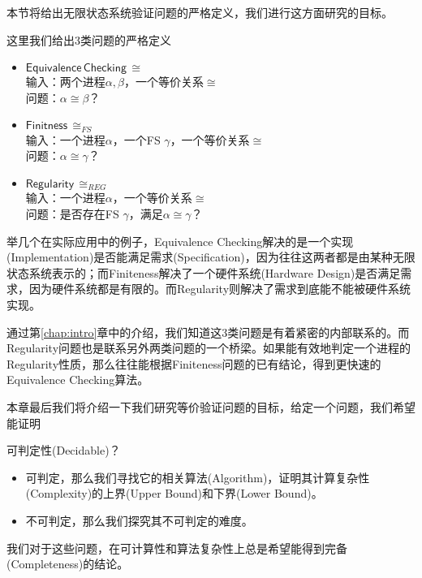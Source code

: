 本节将给出无限状态系统验证问题的严格定义，我们进行这方面研究的目标。
\begin{defn}[问题定义]\label{def:prob}
这里我们给出3类问题的严格定义
\begin{itemize}	
	\item $\mathsf{Equivalence\,Checking}\,\cong$\\
	输入：两个进程$\alpha,\beta$，一个等价关系$\cong$\\
	问题：$\alpha\cong\beta$？	
	\item $\mathsf{Finitness}\,\cong_{FS}$\\
	输入：一个进程$\alpha$，一个FS $\gamma$，一个等价关系$\cong$\\
	问题：$\alpha\cong\gamma$？
	\item $\mathsf{Regularity}\,\cong_{REG}$\\
	输入：一个进程$\alpha$，一个等价关系$\cong$\\
	问题：是否存在FS $\gamma$，满足$\alpha\cong\gamma$？
\end{itemize}
\end{defn}

举几个在实际应用中的例子，Equivalence Checking解决的是一个实现(Implementation)是否能满足需求(Specification)，因为往往这两者都是由某种无限状态系统表示的；而Finiteness解决了一个硬件系统(Hardware Design)是否满足需求，因为硬件系统都是有限的。而Regularity则解决了需求到底能不能被硬件系统实现。

通过第\ref{chap:intro}章中的介绍，我们知道这3类问题是有着紧密的内部联系的。而Regularity问题也是联系另外两类问题的一个桥梁。如果能有效地判定一个进程的Regularity性质，那么往往能根据Finiteness问题的已有结论，得到更快速的Equivalence Checking算法。

本章最后我们将介绍一下我们研究等价验证问题的目标，给定一个问题，我们希望能证明
	 
可判定性(Decidable)？
	\begin{itemize}
		\item 可判定，那么我们寻找它的相关算法(Algorithm)，证明其计算复杂性(Complexity)的上界(Upper Bound)和下界(Lower Bound)。
		\item 不可判定，那么我们探究其不可判定的难度。
	\end{itemize}
我们对于这些问题，在可计算性和算法复杂性上总是希望能得到完备(Completeness)的结论。


